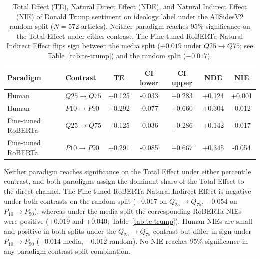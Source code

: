 \begin{table}[h!]
  \centering
  \small
  \begin{tabular}{llS[table-format=+1.3]S[table-format=+1.3]S[table-format=+1.3]S[table-format=+1.3]S[table-format=+1.3]}
    \toprule
    \textbf{Paradigm} & \textbf{Contrast} &
      {\textbf{TE}} &
      {\textbf{CI lower}} & {\textbf{CI upper}} &
      {\textbf{NDE}} & {\textbf{NIE}} \\
    \midrule
    Human
      & $Q25 \to Q75$ & +0.125 & -0.033 & +0.283 & +0.124 & +0.001 \\
    Human
      & $P10 \to P90$ & +0.292 & -0.077 & +0.660 & +0.304 & -0.012 \\
    \addlinespace
    Fine-tuned RoBERTa
      & $Q25 \to Q75$ & +0.125 & -0.036 & +0.286 & +0.142 & -0.017 \\
    Fine-tuned RoBERTa
      & $P10 \to P90$ & +0.291 & -0.085 & +0.667 & +0.345 & -0.054 \\
    \bottomrule
  \end{tabular}
  \caption{Total Effect (TE), Natural Direct Effect (NDE), and Natural Indirect Effect (NIE) of Donald Trump sentiment on ideology label under the AllSidesV2 random split ($N = 572$ articles). Neither paradigm reaches 95\% significance on the Total Effect under either contrast. The Fine-tuned RoBERTa Natural Indirect Effect flips sign between the media split ($+0.019$ under $Q25 \to Q75$; see Table~\ref{tab:te-trump}) and the random split ($-0.017$).}
  \label{tab:random-te-trump-full}
\end{table}

Neither paradigm reaches significance on the Total Effect under either percentile contrast, and both paradigms assign the dominant share of the Total Effect to the direct channel. The Fine-tuned RoBERTa Natural Indirect Effect is negative under both contrasts on the random split ($-0.017$ on $Q_{25} \to Q_{75}$, $-0.054$ on $P_{10} \to P_{90}$), whereas under the media split the corresponding RoBERTa NIEs were positive ($+0.019$ and $+0.040$; Table~\ref{tab:te-trump}). Human NIEs are small and positive in both splits under the $Q_{25} \to Q_{75}$ contrast but differ in sign under $P_{10} \to P_{90}$ ($+0.014$ media, $-0.012$ random). No NIE reaches 95\% significance in any paradigm-contrast-split combination.
